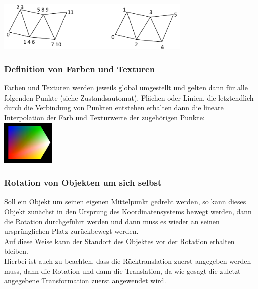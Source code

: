 \includegraphics[width=350px]{images/glTriangleStrip.png}

\subsubsection*{Definition von Farben und Texturen}
Farben und Texturen werden jeweils global umgestellt und gelten dann für alle folgenden Punkte (siehe Zustandsautomat). Flächen oder Linien, die letztendlich durch die Verbindung von Punkten entstehen erhalten dann die lineare Interpolation der Farb und Texturwerte der zugehörigen Punkte:\\

\includegraphics[height=80px]{images/openGlColors.png}

\subsubsection*{Rotation von Objekten um sich selbst}
Soll ein Objekt um seinen eigenen Mittelpunkt gedreht werden, so kann dieses Objekt zunächst in den Ursprung des Koordinatensystems bewegt werden, dann die Rotation durchgeführt werden und dann muss es wieder an seinen ursprünglichen Platz zurückbewegt werden.\\
Auf diese Weise kann der Standort des Objektes vor der Rotation erhalten bleiben.\\
Hierbei ist auch zu beachten, dass die Rücktranslation zuerst angegeben werden muss, dann die Rotation und dann die Translation, da wie gesagt die zuletzt angegebene Transformation zuerst angewendet wird.